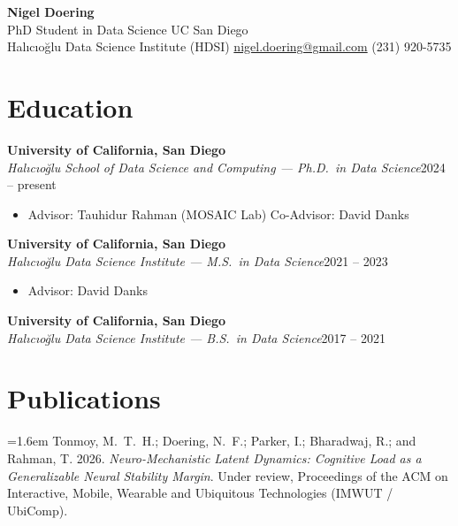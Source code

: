 \documentclass[11pt,letterpaper]{article}
\newcommand{\sep}{\enspace{\color{cvdot}\textbullet}\enspace}
\newcommand{\pub}[1]{%
  {\hangindent=1.6em\hangafter=1 #1\par}\vspace{0.45em}}
\begin{document}
\begin{center}
  {\sffamily\bfseries\fontsize{24}{28}\selectfont\color{cvblue} Nigel Doering}\\[0.35em]
  {\large PhD Student in Data Science \sep UC San Diego}\\[0.25em]
  {\small Halıcıoğlu Data Science Institute (HDSI) \sep
   \href{mailto:nigel.doering@gmail.com}{\color{cvlink}nigel.doering@gmail.com} \sep (231) 920-5735}
\end{center}

\section{Education}

\textbf{University of California, San Diego}\\
\textit{Halıcıoğlu School of Data Science and Computing — Ph.D.\ in Data Science}\hfill 2024 – present
\begin{itemize}
  \item Advisor: Tauhidur Rahman (MOSAIC Lab) \quad Co-Advisor: David Danks
\end{itemize}
\vspace{0.4em}

\textbf{University of California, San Diego}\\
\textit{Halıcıoğlu Data Science Institute — M.S.\ in Data Science}\hfill 2021 – 2023
\begin{itemize}
  \item Advisor: David Danks
\end{itemize}
\vspace{0.4em}

\textbf{University of California, San Diego}\\
\textit{Halıcıoğlu Data Science Institute — B.S.\ in Data Science}\hfill 2017 – 2021

\section{Publications}

\pub{Tonmoy, M.~T.~H.; Doering, N.~F.; Parker, I.; Bharadwaj, R.; and Rahman, T. 2026.
\textit{Neuro-Mechanistic Latent Dynamics: Cognitive Load as a Generalizable Neural Stability Margin}.
Under review, Proceedings of the ACM on Interactive, Mobile, Wearable and Ubiquitous Technologies (IMWUT / UbiComp).}
\end{document}
